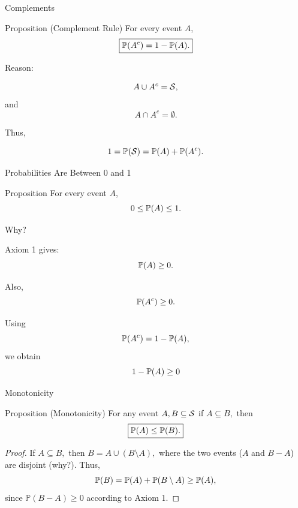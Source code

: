 \begin{frame}{Complements}
\begin{keybox}{Proposition (Complement Rule)}
For every event $A$,
\[
\boxed{
\mathbb{P}(A^c)=1-\mathbb{P}(A).
}
\]
\end{keybox}

\vspace{0.25cm}

Reason:

\[
A\cup A^c=\mathcal{S},
\]
and
\[
A\cap A^c=\emptyset.
\]

Thus,

\[
1
=
\mathbb{P}(\mathcal{S})
=
\mathbb{P}(A)+\mathbb{P}(A^c).
\]
\end{frame}

\begin{frame}{Probabilities Are Between 0 and 1}
\begin{keybox}{Proposition}
For every event $A$,
\[
0\leq \mathbb{P}(A)\leq1.
\]
\end{keybox}

\vspace{0.25cm}

Why?

\vspace{0.2cm}

Axiom 1 gives:
\[
\mathbb{P}(A)\geq0.
\]

Also,
\[
\mathbb{P}(A^c)\geq0.
\]

Using
\[
\mathbb{P}(A^c)=1-\mathbb{P}(A),
\]
we obtain
\[
1-\mathbb{P}(A)\geq0
\]
\end{frame}

\begin{frame}{Monotonicity} \begin{keybox}{Proposition (Monotonicity)} For any event $A,B\subseteq \mathcal{S}$ if $A\subseteq B,$ then \[ \boxed{ \mathbb{P}(A)\leq \mathbb{P}(B). } \] \end{keybox} \vspace{0.25cm} 

\begin{proof}
If $A\subseteq B,$ then $B=A\cup(B\setminus A),$ where the two events ($A$ and $B-A$) are disjoint (why?). 
\vspace{3mm}
Thus, 
\begin{equation*}
    \mathbb{P}(B) = \mathbb{P}(A)+\mathbb{P}(B\setminus A)\geq\mathbb{P}(A),
\end{equation*}
since $\mathbb{P}(B-A)\geq 0$ according to Axiom 1. 
\end{proof}




\end{frame}


